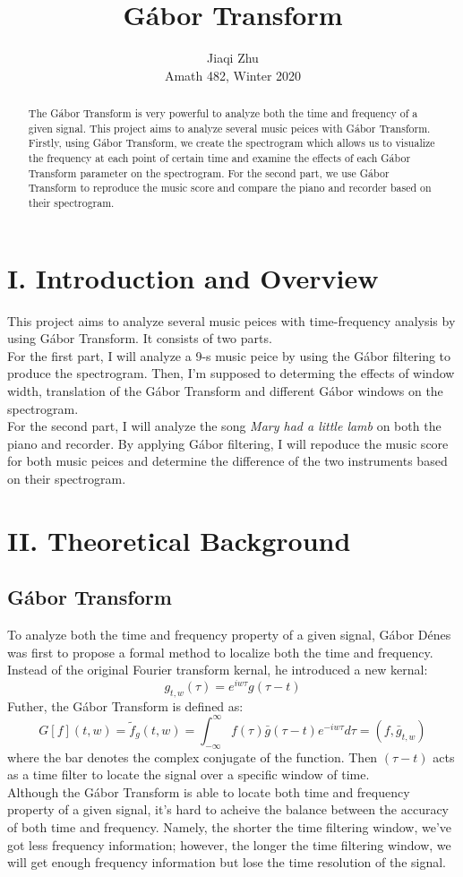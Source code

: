 \documentclass[12pt,letterpaper]{article}
\author{Jiaqi Zhu \\Amath 482, Winter 2020}
\title{G\'abor Transform}
\begin{document}
\maketitle
\begin{abstract}
The G\'abor Transform is very powerful to analyze both the time and frequency of a given signal. This project aims to analyze several music peices with G\'abor Transform. Firstly, using G\'abor Transform, we create the spectrogram which allows us to visualize the frequency at each point of certain time and examine the effects of each G\'abor Transform parameter on the spectrogram. For the second part, we use G\'abor Transform to reproduce the music score and compare the piano and recorder based on their spectrogram.  
\end{abstract}

\section*{I. Introduction and Overview}
This project aims to analyze several music peices with time-frequency analysis by using G\'abor Transform. It consists of two parts. 
\\For the first part, I will analyze a 9-s music peice by using the G\'abor filtering to produce the spectrogram. Then, I'm supposed to determing the effects of window width, translation of the G\'abor Transform and different G\'abor windows on the spectrogram. 
\\For the second part, I will analyze the song \textit{Mary had a little lamb} on both the piano and recorder. By applying G\'abor filtering, I will repoduce the music score for both music peices and determine the difference of the two instruments based on their spectrogram. 

\section*{II. Theoretical Background}
\subsection*{G\'abor Transform}
To analyze both the time and frequency property of a given signal, G\'abor D\'enes was first to propose a formal method to localize both the time and frequency. Instead of the original Fourier transform kernal, he introduced a new kernal:
$$g_{t,w}(\tau) = e^{iw\tau}g(\tau-t)$$
Futher, the G\'abor Transform is defined as:
$$G[f](t,w) = \tilde{f}_g(t,w) = \int_{-\infty}^{\infty}f(\tau)\bar{g}(\tau - t)e^{-iw\tau}d\tau = (f,\bar{g}_{t,w})$$
where the bar denotes the complex conjugate of the function. Then $(\tau - t)$ acts as a time filter to locate the signal over a specific window of time. 
\\Although the G\'abor Transform is able to locate both time and frequency property of a given signal, it's hard to acheive the balance between the accuracy of both time and frequency. Namely, the shorter the time filtering window, we've got less frequency information; however, the longer the time filtering window, we will get enough frequency information but lose the time resolution of the signal. 
\end{document}
